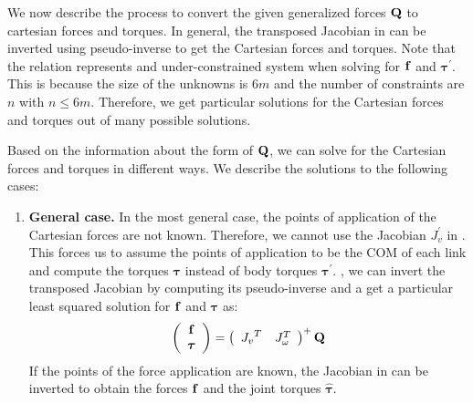 We now describe the process to convert the given generalized forces $\mathbf{Q}$ to cartesian forces and torques. In general, the transposed Jacobian in  can be inverted using pseudo-inverse to get the Cartesian forces and torques. Note that the relation represents and under-constrained system when solving for $\mathbf{f}$ and $\bm{\tau}^{'}$. This is because the size of the unknowns is $6m$ and the number of constraints are $n$ with $n\le 6m$. Therefore, we get particular solutions for the Cartesian forces and torques out of many possible solutions.

Based on the information about the form of $\mathbf{Q}$, we can solve for the Cartesian forces and torques in different ways. We describe the solutions to the following cases:
\begin{enumerate}
\item \textbf{General case. } In the most general case, the points of application of the Cartesian forces are not known. Therefore, we cannot use the Jacobian $J_{v}^{'}$ in . This forces us to assume the points of application to be the COM of each link and compute the torques $\bm{\tau}$ instead of body torques $\bm{\tau}^{'}$. \ie, we can invert the transposed Jacobian by computing its pseudo-inverse and a get a particular least squared solution for $\mathbf{f}$ and $\bm{\tau}$ as:
\begin{equation}
\left (
\begin{array}{c}
\mathbf{f} \\
\bm{\tau}
\end{array}
\right ) = \left (
\begin{array}{cc}
{J_{v}}^T & {J}_\omega^T
\end{array}
\right )^+ \mathbf{Q}
\end{equation}
If the points of the force application are known, the Jacobian in  can be inverted to obtain the forces $\mathbf{f}$ and the joint torques $\hat{\bm{\tau}}$.


\end{enumerate}
